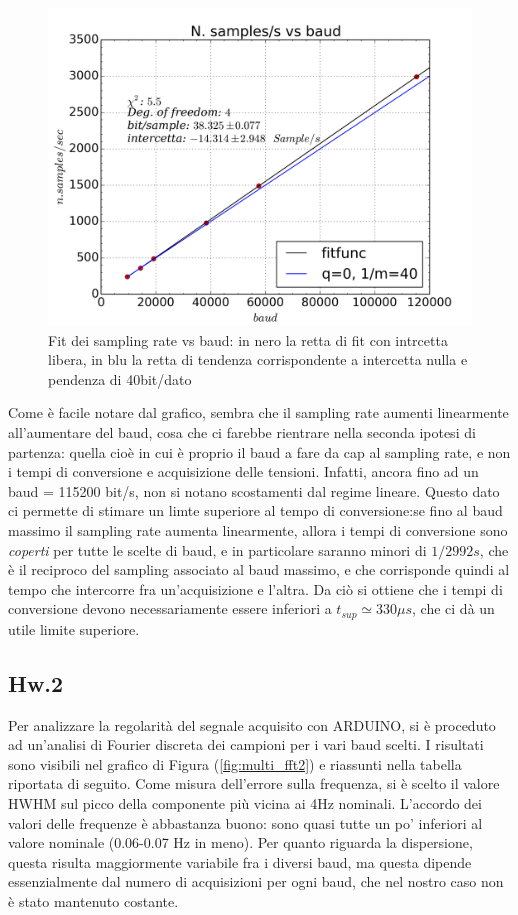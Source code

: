 \documentclass[journal, a4paper]{IEEEtran}
\begin{document}
\begin{figure}
\centering
\includegraphics[width=0.9\linewidth]{./es13_samples_vs_baud}
\caption{Fit dei sampling rate vs baud: in nero la retta di fit con intrcetta libera, in blu la retta di tendenza corrispondente a intercetta nulla e pendenza di 40bit/dato}
\label{fig:es13_samples_vs_baud}
\end{figure}


Come è facile notare dal grafico, sembra che il sampling rate aumenti linearmente all'aumentare del baud, cosa che ci farebbe rientrare nella seconda ipotesi di partenza: quella cioè in cui è proprio il baud a fare da cap al sampling rate, e non i tempi di conversione e acquisizione delle tensioni. Infatti, ancora fino ad un baud = 115200 bit/s, non si notano scostamenti dal regime lineare. Questo dato ci permette di stimare un limte superiore al tempo di conversione:se fino al baud massimo il sampling rate aumenta linearmente, allora i tempi di conversione sono \textit{coperti} per tutte le scelte di baud, e in particolare saranno minori di $1/2992 s$, che è il reciproco del sampling associato al baud massimo, e che corrisponde quindi al tempo che intercorre fra un'acquisizione e l'altra. Da ciò si ottiene che i tempi di conversione devono necessariamente essere inferiori a $t_{sup} \simeq 330 \mu s$, che ci dà un utile limite superiore.\\

\subsection{Hw.2}
Per analizzare la regolarità del segnale acquisito con ARDUINO, si è proceduto ad un'analisi di Fourier discreta dei campioni per i vari baud scelti. I risultati sono visibili nel grafico di Figura (\ref{fig:multi_fft2}) e riassunti nella tabella riportata di seguito. Come misura dell'errore sulla frequenza, si è scelto il valore HWHM sul picco della componente più vicina ai 4Hz nominali. L'accordo dei valori delle frequenze è abbastanza buono: sono quasi tutte un po' inferiori al valore nominale (0.06-0.07 Hz in meno). Per quanto riguarda la dispersione, questa risulta maggiormente variabile fra i diversi baud, ma questa dipende essenzialmente dal numero di acquisizioni per ogni baud, che nel nostro caso non è stato mantenuto costante.
\end{document}
